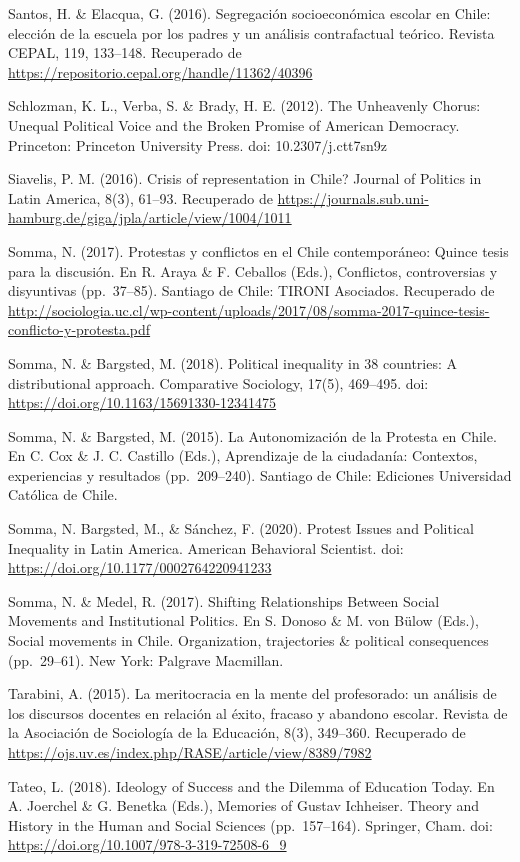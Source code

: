 \documentclass[12pt,twoside]{templates/facsothesis}
\begin{document}
Santos, H. \& Elacqua, G. (2016). Segregación socioeconómica escolar en Chile: elección de la escuela por los padres y un análisis contrafactual teórico. Revista CEPAL, 119, 133--148. Recuperado de \url{https://repositorio.cepal.org/handle/11362/40396}

Schlozman, K. L., Verba, S. \& Brady, H. E. (2012). The Unheavenly Chorus: Unequal Political Voice and the Broken Promise of American Democracy. Princeton: Princeton University Press. doi: 10.2307/j.ctt7sn9z

Siavelis, P. M. (2016). Crisis of representation in Chile? Journal of Politics in Latin America, 8(3), 61--93. Recuperado de \url{https://journals.sub.uni-hamburg.de/giga/jpla/article/view/1004/1011}

Somma, N. (2017). Protestas y conflictos en el Chile contemporáneo: Quince tesis para la discusión. En R. Araya \& F. Ceballos (Eds.), Conflictos, controversias y disyuntivas (pp.~37--85). Santiago de Chile: TIRONI Asociados. Recuperado de \url{http://sociologia.uc.cl/wp-content/uploads/2017/08/somma-2017-quince-tesis-conflicto-y-protesta.pdf}

Somma, N. \& Bargsted, M. (2018). Political inequality in 38 countries: A distributional approach. Comparative Sociology, 17(5), 469--495. doi: \url{https://doi.org/10.1163/15691330-12341475}

Somma, N. \& Bargsted, M. (2015). La Autonomización de la Protesta en Chile. En C. Cox \& J. C. Castillo (Eds.), Aprendizaje de la ciudadanía: Contextos, experiencias y resultados (pp.~209--240). Santiago de Chile: Ediciones Universidad Católica de Chile.

Somma, N. Bargsted, M., \& Sánchez, F. (2020). Protest Issues and Political Inequality in Latin America. American Behavioral Scientist. doi: \url{https://doi.org/10.1177/0002764220941233}

Somma, N. \& Medel, R. (2017). Shifting Relationships Between Social Movements and Institutional Politics. En S. Donoso \& M. von Bülow (Eds.), Social movements in Chile. Organization, trajectories \& political consequences (pp.~29--61). New York: Palgrave Macmillan.

Tarabini, A. (2015). La meritocracia en la mente del profesorado: un análisis de los discursos docentes en relación al éxito, fracaso y abandono escolar. Revista de la Asociación de Sociología de la Educación, 8(3), 349--360. Recuperado de \url{https://ojs.uv.es/index.php/RASE/article/view/8389/7982}

Tateo, L. (2018). Ideology of Success and the Dilemma of Education Today. En A. Joerchel \& G. Benetka (Eds.), Memories of Gustav Ichheiser. Theory and History in the Human and Social Sciences (pp.~157--164). Springer, Cham. doi: \url{https://doi.org/10.1007/978-3-319-72508-6_9}
\end{document}

